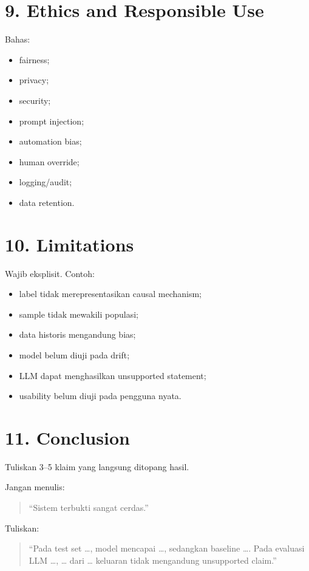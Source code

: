 \documentclass[
  indonesian,
  letterpaper,
  DIV=11,
  numbers=noendperiod]{scrreprt}
\providecommand{\tightlist}{%
  \setlength{\itemsep}{0pt}\setlength{\parskip}{0pt}}
\begin{document}
\chapter{9. Ethics and Responsible
Use}\label{ethics-and-responsible-use}

Bahas:

\begin{itemize}
\tightlist
\item
  fairness;
\item
  privacy;
\item
  security;
\item
  prompt injection;
\item
  automation bias;
\item
  human override;
\item
  logging/audit;
\item
  data retention.
\end{itemize}

\chapter{10. Limitations}\label{limitations}

Wajib eksplisit. Contoh:

\begin{itemize}
\tightlist
\item
  label tidak merepresentasikan causal mechanism;
\item
  sample tidak mewakili populasi;
\item
  data historis mengandung bias;
\item
  model belum diuji pada drift;
\item
  LLM dapat menghasilkan unsupported statement;
\item
  usability belum diuji pada pengguna nyata.
\end{itemize}

\chapter{11. Conclusion}\label{conclusion}

Tuliskan 3--5 klaim yang langsung ditopang hasil.

Jangan menulis:

\begin{quote}
``Sistem terbukti sangat cerdas.''
\end{quote}

Tuliskan:

\begin{quote}
``Pada test set \ldots, model mencapai \ldots, sedangkan baseline
\ldots. Pada evaluasi LLM \ldots, \ldots{} dari \ldots{} keluaran tidak
mengandung unsupported claim.''
\end{quote}
\end{document}
